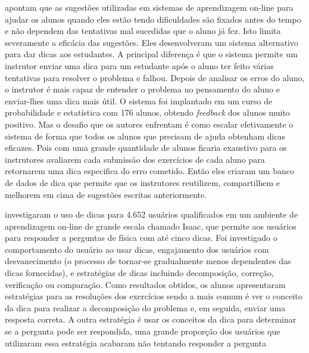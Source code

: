  apontam que as sugestões utilizadas em sistemas de aprendizagem on-line para ajudar os alunos quando eles estão tendo dificuldades são fixados antes do tempo e não dependem das tentativas mal sucedidas que o aluno já fez. Isto limita severamente a eficácia das sugestões. Eles desenvolveram um sistema alternativo para dar dicas aos estudantes. A principal diferença é que o sistema permite um instrutor enviar uma dica para um estudante após o aluno ter feito várias tentativas para resolver o problema e falhou. Depois de analisar os erros do aluno, o instrutor é mais capaz de entender o problema no pensamento do aluno e enviar-lhes uma dica mais útil. O sistema foi implantado em um curso de probabilidade e estatística com 176 alunos, obtendo \textit{feedback} dos alunos muito positivo. Mas o desafio que os autores enfrentam é como escalar efetivamente o sistema de forma que todos os alunos que precisam de ajuda obtenham dicas eficazes. Pois com uma grande quantidade de alunos ficaria exaustivo para os instrutores avaliarem cada submissão dos exercícios de cada aluno para retornarem uma dica especifica do erro cometido. Então eles criaram um banco de dados de dica que permite que os instrutores reutilizem, compartilhem e melhorem em cima de sugestões escritas anteriormente.

 investigaram  o uso de dicas para 4.652 usuários qualificados em um ambiente de aprendizagem on-line de grande escala chamado Isaac, que permite aos usuários para responder a perguntas de física com até cinco dicas. Foi investigado o comportamento do usuário ao usar dicas, engajamento dos usuários com desvanecimento (o processo de tornar-se gradualmente menos dependentes das dicas fornecidas), e estratégias de dicas incluindo decomposição, correção, verificação ou comparação. Como resultados obtidos, os alunos apresentaram estratégias para as resoluções dos exercícios sendo a mais comum é ver o conceito da dica para realizar a decomposição do problema e, em seguida, enviar uma resposta correta. A outra estratégia é usar os conceitos da dica para determinar se a pergunta pode ser respondida, uma grande proporção dos usuários que utilizaram essa estratégia acabaram não tentando responder a pergunta


